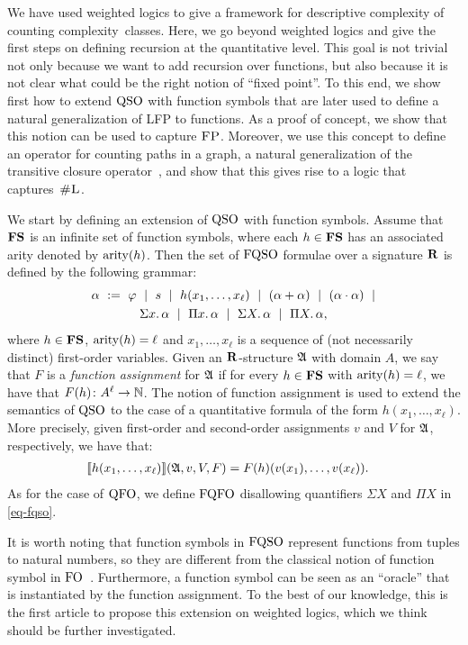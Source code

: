 
We have used weighted logics to give a framework for descriptive complexity of counting complexity~classes. Here, we go beyond weighted logics and give the first steps on defining recursion at the quantitative level.
This goal is not trivial not only because we want to add recursion over functions, but also because 
it is not clear what could be the right notion of ``fixed point''. 
To this end, we show first how to extend ${\rm QSO}$ with function symbols that are later
used 
to define a natural generalization of LFP to functions.
 As a proof of concept, we show that this notion can be used to capture $\text{\sc FP}$.
Moreover, we use this concept
to define an operator for counting paths in a graph, a natural generalization of the transitive closure operator~\cite{immerman1999descriptive}, and show that this gives rise to a logic that captures~$\text{\sc \#L}$. 

We start by defining an extension of ${\rm QSO}$ with function symbols. Assume that $\mathbf{FS}$ is an infinite set of function symbols, where each $h \in \mathbf{FS}$ has an associated arity denoted by ${\rm arity}(h)$. Then the set of ${\rm FQSO}$ formulae over a signature $\mathbf{R}$ is defined by the following grammar:
\begin{multline}
\label{eq-fqso}
	\alpha \ :=  \ \varphi \ \mid \  s \  \mid \  h(x_1, \ldots, x_\ell) \  \mid \
	(\alpha + \alpha) \  \mid\  (\alpha \cdot \alpha) \  \mid \\
	\Sigma{x}.\, \alpha \  \mid \
	\Pi{x}.\, \alpha \  \mid \
	\Sigma{X}.\, \alpha \  \mid \
	\Pi{X}.\, \alpha,
\end{multline}
where $h \in \mathbf{FS}$, ${\rm arity}(h) = \ell$ and $x_1, \ldots, x_\ell$ is a sequence of (not necessarily distinct) first-order variables. Given an $\mathbf{R}$-structure $\mathfrak{A}$ with domain $A$, we say that $F$ is a \emph{function assignment} for $\mathfrak{A}$ if for every $h \in \mathbf{FS}$ with ${\rm arity}(h) = \ell$, we have that $F(h)\colon A^\ell \to \mathbb{N}$. The notion of function assignment is used to extend the semantics of ${\rm QSO}$ to the case of a quantitative formula of the form $h(x_1, \ldots, x_\ell)$. More precisely, given first-order and second-order assignments $v$ and $V$ for $\mathfrak{A}$, respectively, 
we have that:
\begin{align*}
{\llbracket{}{h(x_1, \ldots, x_\ell)}\rrbracket}(\mathfrak{A},v,V,F) &= F(h)(v(x_1),\ldots, v(x_\ell)).
\end{align*}
As for the case of ${\rm QFO}$, we define ${\rm FQFO}$ disallowing quantifiers $\Sigma X$ and $\Pi X$ in \eqref{eq-fqso}.

It is worth noting that function symbols in ${\rm FQSO}$ represent functions from tuples to natural numbers, so they are different from the classical notion of function symbol in ${\rm FO}$~\cite{L04}. 
Furthermore, a function symbol can be seen as an ``oracle'' that is instantiated by the function assignment. 
To the best of our knowledge, this is the first article to propose this extension on weighted logics, which we think should be further investigated. 

